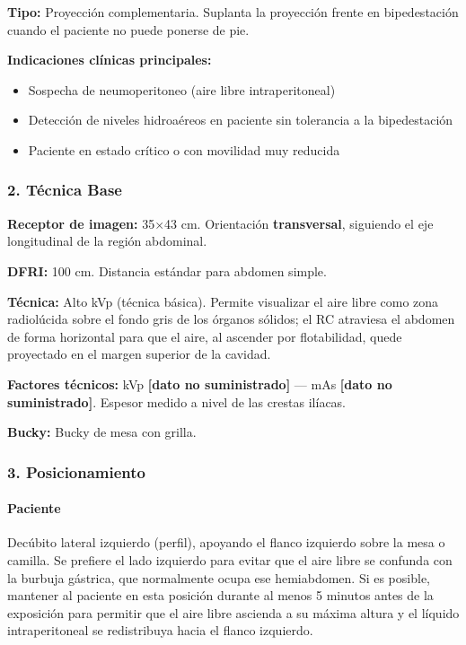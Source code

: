 	\textbf{Tipo:} Proyección complementaria. Suplanta la proyección frente en bipedestación cuando el paciente no puede ponerse de pie.
	
	\textbf{Indicaciones clínicas principales:}
	\begin{itemize}
		\item Sospecha de neumoperitoneo (aire libre intraperitoneal)
		\item Detección de niveles hidroaéreos en paciente sin tolerancia a la bipedestación
		\item Paciente en estado crítico o con movilidad muy reducida
	\end{itemize}
	
	\subsubsection*{2. Técnica Base}
	
	\textbf{Receptor de imagen:} 35$\times$43 cm. Orientación \textbf{transversal}, siguiendo el eje longitudinal de la región abdominal.
	
	\textbf{DFRI:} 100 cm. Distancia estándar para abdomen simple.
	
	\textbf{Técnica:} Alto kVp (técnica básica). Permite visualizar el aire libre como zona radiolúcida sobre el fondo gris de los órganos sólidos; el RC atraviesa el abdomen de forma horizontal para que el aire, al ascender por flotabilidad, quede proyectado en el margen superior de la cavidad.
	
	\textbf{Factores técnicos:} kVp \textbf{[dato no suministrado]} --- mAs \textbf{[dato no suministrado]}. Espesor medido a nivel de las crestas ilíacas.
	
	\textbf{Bucky:} Bucky de mesa con grilla.
	
	\subsubsection*{3. Posicionamiento}
	
	\paragraph{Paciente}
	Decúbito lateral izquierdo (perfil), apoyando el flanco izquierdo sobre la mesa o camilla. Se prefiere el lado izquierdo para evitar que el aire libre se confunda con la burbuja gástrica, que normalmente ocupa ese hemiabdomen. Si es posible, mantener al paciente en esta posición durante al menos 5 minutos antes de la exposición para permitir que el aire libre ascienda a su máxima altura y el líquido intraperitoneal se redistribuya hacia el flanco izquierdo.
	
